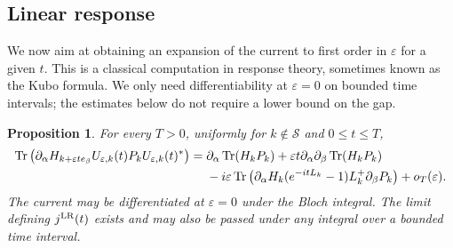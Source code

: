 \documentclass[a4paper,11pt]{article}
\theoremstyle{plain}
\newtheorem{proposition}[theorem]{Proposition}
\theoremstyle{remark}
\def\eps{{\varepsilon}}
\begin{document}
\subsection{Linear response}
\label{subsec:lr}

We now aim at obtaining an expansion of the current to first order in
$\eps$ for a given $t$. This is a classical computation in response
theory, sometimes known as the Kubo formula. We only need
differentiability at $\eps=0$ on bounded time intervals; the estimates
below do not require a lower bound on the gap.

\begin{proposition}\label{prop:response}
For every $T>0$, uniformly for $k\notin\mathcal S$ and $0\le t\le T$,
\begin{align}\label{eq:response_expansion}
\Tr\left(\partial_\alpha H_{k+\eps te_\beta}
U_{\eps,k}(t)P_kU_{\eps,k}(t)^*\right)
={}&\partial_\alpha\Tr(H_kP_k)
+\eps t\partial_\alpha\partial_\beta\Tr(H_kP_k)\nonumber\\
&-i\eps\Tr\left(\partial_\alpha H_k(e^{-itL_k}-1)
L_k^+\partial_\beta P_k\right)+o_T(\eps).
\end{align}
The current may be differentiated at $\eps=0$ under the Bloch integral.
The limit defining $j^{\rm LR}(t)$ exists and may also be passed under
any integral over a bounded time interval.
\end{proposition}
\end{document}
